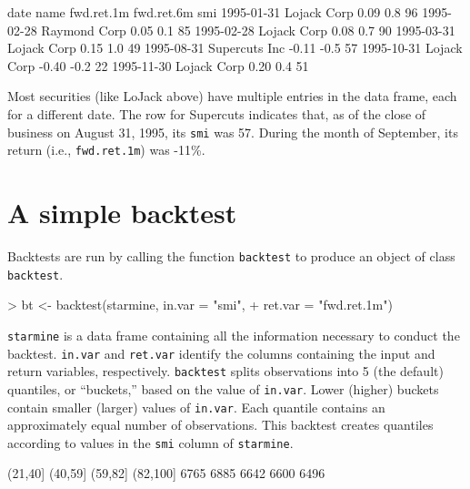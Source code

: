 \documentclass[a4paper]{report}
\begin{document}
\begin{article}
\begin{Schunk}
\begin{Soutput}
      date          name fwd.ret.1m fwd.ret.6m smi
1995-01-31   Lojack Corp       0.09        0.8  96
1995-02-28  Raymond Corp       0.05        0.1  85
1995-02-28   Lojack Corp       0.08        0.7  90
1995-03-31   Lojack Corp       0.15        1.0  49
1995-08-31 Supercuts Inc      -0.11       -0.5  57
1995-10-31   Lojack Corp      -0.40       -0.2  22
1995-11-30   Lojack Corp       0.20        0.4  51
\end{Soutput}
\end{Schunk}


Most securities (like LoJack above) have multiple entries in the data
frame, each for a different date.  The row for Supercuts indicates
that, as of the close of business on August 31, 1995, its \texttt{smi}
was 57.  During the month of September, its return (i.e.,
\texttt{fwd.ret.1m}) was -11\%.

\section*{A simple backtest}

Backtests are run by calling the function \texttt{backtest} to
produce an object of class \texttt{backtest}.

\begin{Schunk}
\begin{Sinput}
> bt <- backtest(starmine, in.var = "smi", 
+     ret.var = "fwd.ret.1m")
\end{Sinput}
\end{Schunk}

\texttt{starmine} is a data frame containing all the information
necessary to conduct the backtest.  \texttt{in.var} and
\texttt{ret.var} identify the columns containing the input and return
variables, respectively. \texttt{backtest} splits observations into 5
(the default) quantiles, or ``buckets,'' based on the value of
\texttt{in.var}.  Lower (higher) buckets contain smaller (larger)
values of \texttt{in.var}.  Each quantile contains an approximately
equal number of observations.  This backtest creates quantiles
according to values in the \texttt{smi} column of \texttt{starmine}.

\begin{Schunk}
\begin{Soutput}
  [1,21]  (21,40]  (40,59]  (59,82] (82,100] 
    6765     6885     6642     6600     6496 
\end{Soutput}
\end{Schunk}


\end{article}
\end{document}
